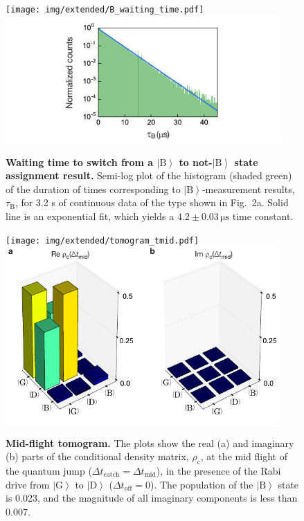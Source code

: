 \documentclass[
	 			preprint,     		superscriptaddress, 																longbibliography,
		amsmath, amssymb,
		aps,  prb,   		floatfix,
		linenumbers     
	]{revtex4-1}
\newcommand{\ket}[1]{\left|#1\right>}
\newcommand{\B}{\ket{\mathrm{B}}}
\begin{document}
\begin{figure}[!ht]
\begin{centering}
\ifjournal
	\texttt{[image: img/extended/B\_waiting\_time.pdf]} 
\else
	\includegraphics[width=105mm]{B_waiting_time.pdf} 
\fi
\caption{ \label{fig:B-wait-time}
\textbf{Waiting time to switch from a $\B$ to not-$\B$ state assignment result.}  
Semi-log plot of the histogram (shaded green) of the duration of times corresponding to $\B$-measurement results, $\tau_{\operatorname{B}}$, for 3.2 s of continuous data of the type shown in Fig.~2a.
Solid line is an exponential fit, which yields a $4.2\pm0.03\,\mathrm{\mu s}$ time constant.
}
\end{centering}
\end{figure}






\begin{figure}[!ht]
\begin{centering}
\ifjournal
	\texttt{[image: img/extended/tomogram\_tmid.pdf]} 
\else
	\includegraphics[width=105mm]{tomogram_tmid.pdf} 
\fi
\caption{ \label{fig:tomo_tmid}
\textbf{Mid-flight tomogram.}  
The plots show the real (a) and imaginary (b) parts of the conditional density matrix, $\rho_\mathrm{c}$, at the mid flight of the quantum jump ($\Delta t_\mathrm{catch} = \Delta t_\mathrm{mid}$), in the presence of the Rabi drive from $\ket{\mathrm{G}}$ to $\ket{\mathrm{D}}$ ($\Delta t_\mathrm{off} = 0$).
The population of the $\ket{\mathrm{B}}$ state is 0.023, and the magnitude of all imaginary components is less than 0.007. 
}
\end{centering}
\end{figure}
\end{document}
